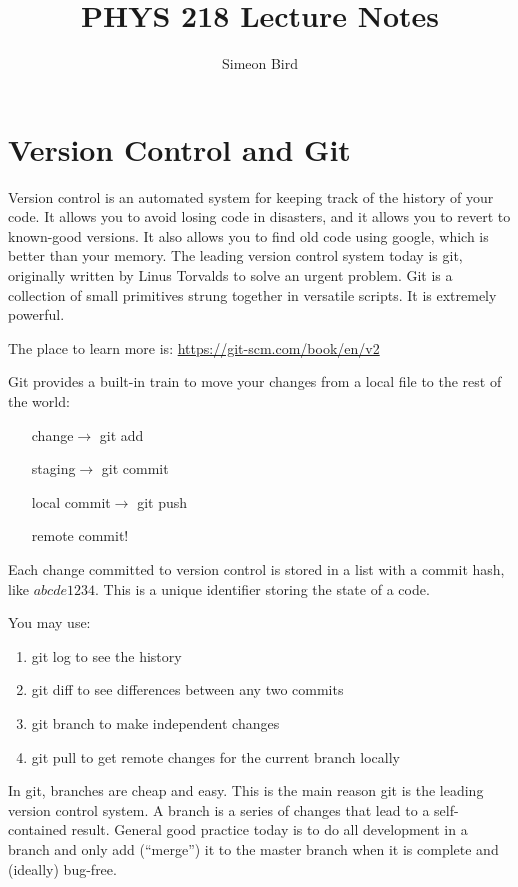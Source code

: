 \documentclass[12pt]{article}
\begin{document}
\title{PHYS 218 Lecture Notes}
\author{Simeon Bird}
\maketitle

\section{Version Control and Git}

Version control is an automated system for keeping track of the history of your code. It allows you to avoid losing code in disasters, and it allows you to revert to known-good versions. It also allows you to find old code using google, which is better than your memory. The leading version control system today is git, originally written by Linus Torvalds to solve an urgent problem. Git is a collection of small primitives strung together in versatile scripts. It is extremely powerful.

The place to learn more is: \url{https://git-scm.com/book/en/v2}

Git provides a built-in train to move your changes from a local file to the rest of the world:

\begin{enumerate}
 \item[change$\rightarrow$] git add
 \item[staging$\rightarrow$] git commit
 \item[local commit$\rightarrow$] git push
 \item[remote commit!]
\end{enumerate}

Each change committed to version control is stored in a list with a commit hash, like $abcde1234$. This is a unique identifier storing the state of a code.

You may use:
\begin{enumerate}
 \item git log to see the history
 \item git diff to see differences between any two commits
 \item git branch to make independent changes
 \item git pull to get remote changes for the current branch locally
\end{enumerate}

In git, branches are cheap and easy. This is the main reason git is the leading version control system. A branch is a series of changes that lead to a self-contained result. General good practice today is to do all development in a branch and only add (``merge'') it to the master branch when it is complete and (ideally) bug-free.
\end{document}

